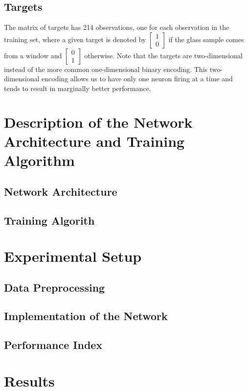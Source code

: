 \documentclass[12pt,halfline,a4paper]{ouparticle}
\begin{document}
\subsection{Targets}
The matrix of targets has 214 observations, one for each observation in the training set, where a given target is denoted by $\begin{bmatrix} 1 \\ 0 \end{bmatrix}$ if the glass sample comes from a window and $\begin{bmatrix} 0 \\ 1 \end{bmatrix}$ otherwise. Note that the targets are two-dimensional instead of the more common one-dimensional binary encoding. This two-dimensional encoding allows us to have only one neuron firing at a time and tends to result in marginally better performance. 


\section{Description of the Network Architecture and Training Algorithm}

\subsection{Network Architecture}
\subsection{Training Algorith}

\section{Experimental Setup}

\subsection{Data Preprocessing}
\subsection{Implementation of the Network}
\subsection{Performance Index}

\section{Results}
\end{document}
